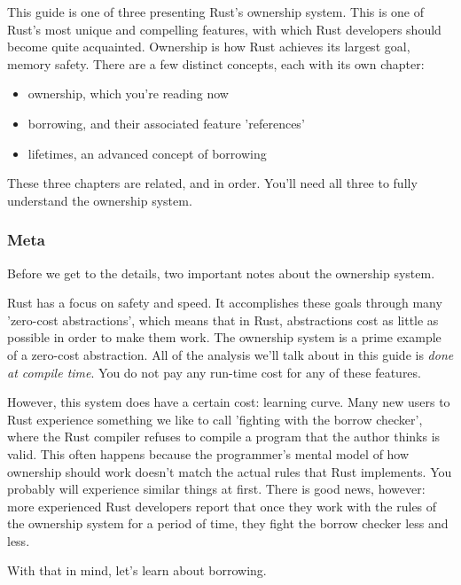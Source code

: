 This guide is one of three presenting Rust's ownership system. This is one of Rust's most unique and compelling features, with 
which Rust developers should become quite acquainted. Ownership is how Rust achieves its largest goal, memory safety. There are 
a few distinct concepts, each with its own chapter:

\begin{itemize}
  \item{ownership, which you're reading now}
  \item{borrowing, and their associated feature 'references'}
  \item{lifetimes, an advanced concept of borrowing}
\end{itemize}

These three chapters are related, and in order. You'll need all three to fully understand the ownership system.

\subsubsection*{Meta}

Before we get to the details, two important notes about the ownership system.

\blank

Rust has a focus on safety and speed. It accomplishes these goals through many 'zero-cost abstractions', which means that in 
Rust, abstractions cost as little as possible in order to make them work. The ownership system is a prime example of a zero-cost
abstraction. All of the analysis we'll talk about in this guide is \emph{done at compile time}. You do not pay any run-time cost 
for any of these features.

\blank

However, this system does have a certain cost: learning curve. Many new users to Rust experience something we like to call 
'fighting with the borrow checker', where the Rust compiler refuses to compile a program that the author thinks is valid. 
This often happens because the programmer's mental model of how ownership should work doesn't match the actual rules that Rust 
implements. You probably will experience similar things at first. There is good news, however: more experienced Rust developers 
report that once they work with the rules of the ownership system for a period of time, they fight the borrow checker less and less.

\blank

With that in mind, let's learn about borrowing.

